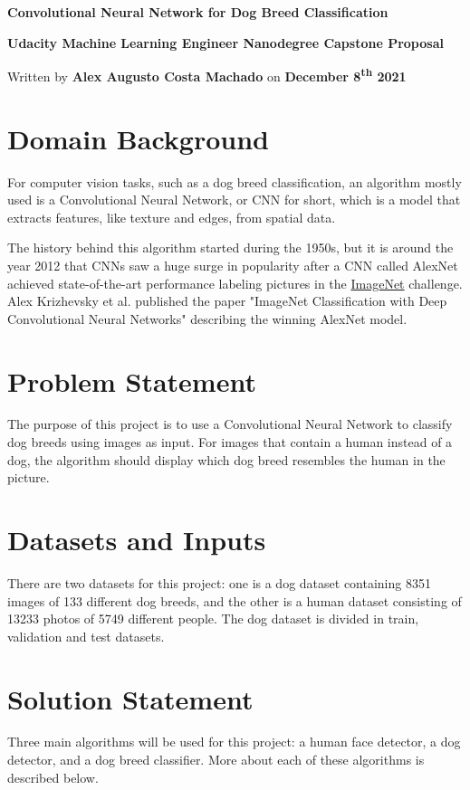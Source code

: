 \documentclass{article}
\newcommand{\doctitle}{Convolutional Neural Network for Dog Breed Classification}
\newcommand{\docsubtitle}{Udacity Machine Learning Engineer Nanodegree Capstone Proposal}
\newcommand{\docauthor}{Alex Augusto Costa Machado}
\newcommand{\docdate}{December 8\textsuperscript{th} 2021}
\newcommand{\docinfo}{
    \thispagestyle{empty}

    \begin{center}

        \Huge\textbf{\doctitle}
        \vspace{2mm}

        \LARGE\textbf{\docsubtitle}
        
        \vspace{3mm}
        \large
        Written by \textbf{\docauthor} on \textbf{\docdate}

    \end{center}
}
\begin{document}
    \docinfo

    \section{Domain Background}
    For computer vision tasks, such as a dog breed classification, an algorithm mostly used is a Convolutional Neural Network, or CNN for short, which is a model that extracts features, like texture and edges, from spatial data.

    The history behind this algorithm started during the 1950s, but it is around the year 2012 that CNNs saw a huge surge in popularity after a CNN called AlexNet achieved state-of-the-art performance labeling pictures in the \href{https://image-net.org/}{ImageNet} challenge. Alex Krizhevsky et al. published the paper "ImageNet Classification with Deep Convolutional Neural Networks" describing the winning AlexNet model.

    \section{Problem Statement}
    The purpose of this project is to use a Convolutional Neural Network to classify dog breeds using images as input. For images that contain a human instead of a dog, the algorithm should display which dog breed resembles the human in the picture.

    \section{Datasets and Inputs}
    There are two datasets for this project: one is a dog dataset containing 8351 images of 133 different dog breeds, and the other is a human dataset consisting of 13233 photos of 5749 different people. The dog dataset is divided in train, validation and test datasets.

    \section{Solution Statement}
    Three main algorithms will be used for this project: a human face detector, a dog detector, and a dog breed classifier. More about each of these algorithms is described below.
\end{document}

